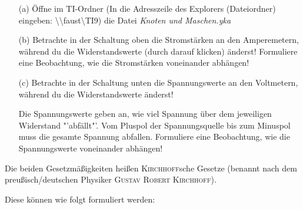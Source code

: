 \begin{Aufgabe}
\hfill \par \vspace*{-.8cm}
\begin{itemize}
\item[(a)] Öffne im TI-Ordner (In die Adresszeile des Explorers (Dateiordner) eingeben: \textbackslash \textbackslash faust\textbackslash TI9) die Datei \emph{Knoten und Maschen.yka}
\item[(b)] Betrachte in der Schaltung oben die Stromstärken an den Amperemetern, während du die Widerstandswerte (durch darauf klicken) änderst!
Formuliere eine Beobachtung, wie die Stromstärken voneinander abhängen!
\item[(c)] Betrachte in der Schaltung unten die Spannungswerte an den Voltmetern, während du die Widerstandswerte änderst! 

Die Spannungswerte geben an, wie viel Spannung über dem jeweiligen Widerstand "'abfällt"'. Vom Pluspol der Spannungsquelle bis zum Minuspol muss die gesamte Spannung abfallen.
Formuliere eine Beobachtung, wie die Spannungswerte voneinander abhängen!
\end{itemize}
\end{Aufgabe}





Die beiden Gesetzmäßigkeiten heißen \textsc{Kirchhoff}sche Gesetze (benannt nach dem preußisch/deutschen Physiker \textsc{Gustav Robert Kirchhoff}).

Diese können wie folgt formuliert werden:


